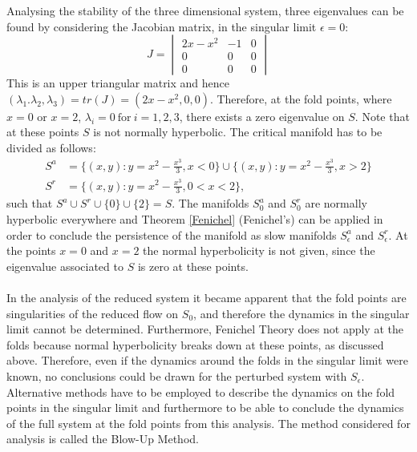 Analysing the stability of the three dimensional system, three eigenvalues can be found by considering the Jacobian matrix, in the singular limit $\epsilon=0$: 
\begin{equation} 
J=\begin{vmatrix} 2x-x^2 & -1&0 \\ 0 & 0&0\\0&0&0\end{vmatrix}
\label{eq: Eigenvalues}
\end{equation}
This is an upper triangular matrix and hence $(\lambda_1.\lambda_2,\lambda_3)=tr(J)= (2x-x^2,0,0)$. Therefore, at the fold points, where $x=0$ or $x=2$, $\lambda_i=0 \ \text{for} \ i=1,2,3$, there exists a zero eigenvalue on $S$. Note that at these points $S$ is not normally hyperbolic.
The critical manifold has to be divided as follows:
\begin{align*}
S^a &=\bigg \lbrace (x,y): y = x^2-\frac{x^3}{3}, x< 0 \bigg \rbrace \cup \bigg \lbrace (x,y): y = x^2-\frac{x^3}{3}, x>2 \bigg\rbrace \\
S^r &= \bigg\lbrace (x,y): y = x^2-\frac{x^3}{3}, 0< x< 2 \bigg\rbrace,
\end{align*}
such that $S^a \cup S^r \cup \{0\} \cup \{2\} = S$.
The manifolds $S^a_0$ and $S^r_0$ are normally hyperbolic everywhere and  Theorem \ref{Fenichel} (Fenichel's) can be applied in order to conclude the persistence of the manifold as slow manifolds $S^a_\epsilon$ and $S^r_\epsilon$. At the points $x=0$ and $x=2$ the normal hyperbolicity is not given, since the eigenvalue associated to $S$ is zero at these points.
\\
\\
In the analysis of the reduced system it became apparent that the fold points are singularities of the reduced flow on $S_0$, and therefore the dynamics in the singular limit cannot be determined. Furthermore, Fenichel Theory does not apply at the folds because normal hyperbolicity breaks down at these points, as discussed above. Therefore, even if the dynamics around the folds in the singular limit were known, no conclusions could be drawn for the perturbed system with $S_\epsilon$.
Alternative methods have to be employed to describe the dynamics on the fold points in the singular limit and furthermore to be able to conclude the dynamics of the full system at the fold points from this analysis.
The method considered for analysis is called the Blow-Up Method.

